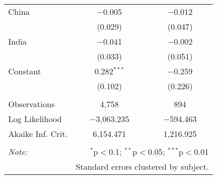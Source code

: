 \begin{table}[!htbp]
\begin{tabular}{@{\extracolsep{5pt}}lcc}
  China & $-$0.005 & $-$0.012 \\ 
  & (0.029) & (0.047) \\ 
  India & $-$0.041 & $-$0.002 \\ 
  & (0.033) & (0.051) \\ 
  Constant & 0.282$^{***}$ & $-$0.259 \\ 
  & (0.102) & (0.226) \\ 
 \hline \\[-1.8ex] 
Observations & 4,758 & 894 \\ 
Log Likelihood & $-$3,063.235 & $-$594.463 \\ 
Akaike Inf. Crit. & 6,154.471 & 1,216.925 \\ 
\hline 
\hline \\[-1.8ex] 
\textit{Note:}  & \multicolumn{2}{r}{$^{*}$p$<$0.1; $^{**}$p$<$0.05; $^{***}$p$<$0.01} \\ 
 & \multicolumn{2}{r}{Standard errors clustered by subject.} \\ 
\end{tabular} 
\end{table} 
